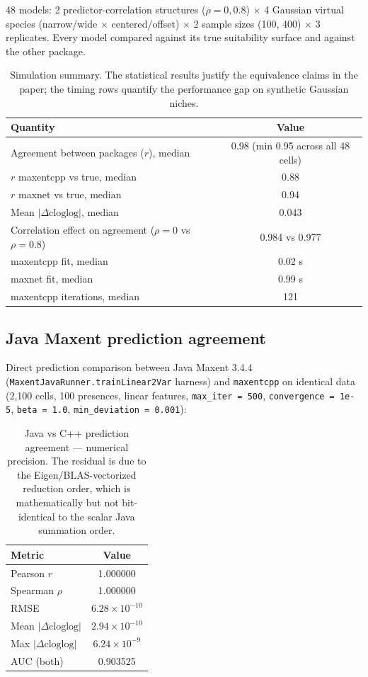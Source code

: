 48 models: 2 predictor-correlation structures ($\rho = 0, 0.8$)
$\times$ 4 Gaussian virtual species (narrow/wide $\times$
centered/offset) $\times$ 2 sample sizes (100, 400) $\times$ 3
replicates.  Every model compared against its true suitability surface
and against the other package.

\begin{table}[h]
\centering
\small
\begin{tabular}{lc}
\toprule
\textbf{Quantity} & \textbf{Value} \\
\midrule
Agreement between packages ($r$), median & 0.98 (min 0.95 across all 48 cells) \\
$r$ maxentcpp vs true, median & 0.88 \\
$r$ maxnet vs true, median & 0.94 \\
Mean $|\Delta\text{cloglog}|$, median & 0.043 \\
Correlation effect on agreement ($\rho=0$ vs $\rho=0.8$) & 0.984 vs 0.977 \\
maxentcpp fit, median & 0.02 s \\
maxnet fit, median & 0.99 s \\
maxentcpp iterations, median & 121 \\
\bottomrule
\end{tabular}
\caption{Simulation summary.  The statistical results justify the
equivalence claims in the paper; the timing rows quantify the
performance gap on synthetic Gaussian niches.}
\label{tab:sim}
\end{table}

\subsection{Java Maxent prediction agreement}

Direct prediction comparison between Java Maxent 3.4.4
(\texttt{MaxentJavaRunner.trainLinear2Var} harness) and
\texttt{maxentcpp} on identical data (2,100 cells, 100 presences,
linear features, \texttt{max\_iter = 500}, \texttt{convergence =
1e-5}, \texttt{beta = 1.0}, \texttt{min\_deviation = 0.001}):

\begin{table}[h]
\centering
\small
\begin{tabular}{lc}
\toprule
\textbf{Metric} & \textbf{Value} \\
\midrule
Pearson $r$ & 1.000000 \\
Spearman $\rho$ & 1.000000 \\
RMSE & $6.28 \times 10^{-10}$ \\
Mean $|\Delta\text{cloglog}|$ & $2.94 \times 10^{-10}$ \\
Max $|\Delta\text{cloglog}|$ & $6.24 \times 10^{-9}$ \\
AUC (both) & 0.903525 \\
\bottomrule
\end{tabular}
\caption{Java vs C++ prediction agreement --- numerical precision.  The
residual is due to the Eigen/BLAS-vectorized reduction order, which is
mathematically but not bit-identical to the scalar Java summation
order.}
\label{tab:java}
\end{table}

